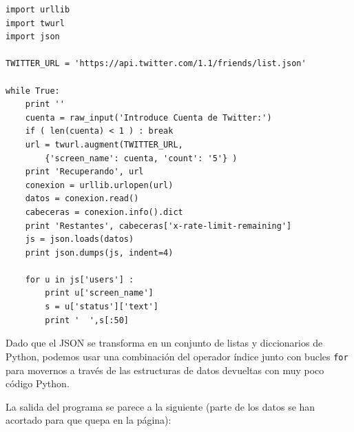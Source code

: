 \beforeverb
\begin{verbatim}
import urllib
import twurl
import json

TWITTER_URL = 'https://api.twitter.com/1.1/friends/list.json'

while True:
    print ''
    cuenta = raw_input('Introduce Cuenta de Twitter:')
    if ( len(cuenta) < 1 ) : break
    url = twurl.augment(TWITTER_URL,
        {'screen_name': cuenta, 'count': '5'} )
    print 'Recuperando', url
    conexion = urllib.urlopen(url)
    datos = conexion.read()
    cabeceras = conexion.info().dict
    print 'Restantes', cabeceras['x-rate-limit-remaining']
    js = json.loads(datos)
    print json.dumps(js, indent=4)

    for u in js['users'] :
        print u['screen_name']
        s = u['status']['text']
        print '  ',s[:50]
\end{verbatim}
\afterverb
%
Dado que el JSON se transforma en un conjunto de listas y diccionarios de Python,
podemos usar una combinación del operador índice junto con bucles {\tt for} para
movernos a través de las estructuras de datos devueltas con muy poco
código Python.

La salida del programa se parece a la siguiente (parte de los datos
se han acortado para que quepa en la página):

